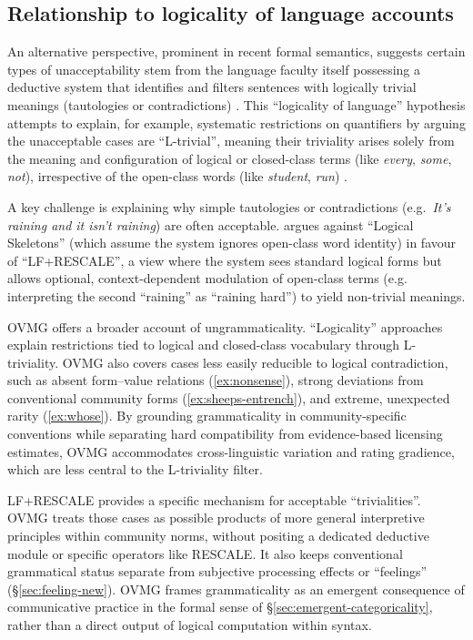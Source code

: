 \documentclass[12pt,letterpaper]{article}
\newcommand{\mention}[1]{\textit{#1}}
\begin{document}
\subsection{Relationship to logicality of language accounts}

An alternative perspective, prominent in recent formal semantics, suggests certain types of unacceptability stem from the language faculty itself possessing a deductive system that identifies and filters sentences with logically trivial meanings (tautologies or contradictions) \autocite[cf.][]{del_pinal_logicality_2019, chierchia_logic_2013, fox_economy_2000}. This \enquote{logicality of language} hypothesis attempts to explain, for example, systematic restrictions on quantifiers by arguing the unacceptable cases are \enquote{L-trivial}, meaning their triviality arises solely from the meaning and configuration of logical or closed-class terms (like \mention{every}, \mention{some}, \mention{not}), irrespective of the open-class words (like \mention{student}, \mention{run}) \autocite{gajewski_l-triviality_2009}.

A key challenge is explaining why simple tautologies or contradictions (e.g.\, \mention{It's raining and it isn't raining}) are often acceptable. \textcite{del_pinal_logicality_2019} argues against \enquote{Logical Skeletons} (which assume the system ignores open-class word identity) in favour of \enquote{LF+RESCALE}, a view where the system sees standard logical forms but allows optional, context-dependent modulation of open-class terms (e.g.\, interpreting the second \enquote{raining} as \enquote{raining hard}) to yield non-trivial meanings.

OVMG offers a broader account of ungrammaticality. \enquote{Logicality}
approaches explain restrictions tied to logical and closed-class vocabulary
through L-triviality. OVMG also covers cases less easily reducible to logical
contradiction, such as absent form--value relations (\ref{ex:nonsense}), strong
deviations from conventional community forms (\ref{ex:sheeps-entrench}), and
extreme, unexpected rarity (\ref{ex:whose}). By grounding grammaticality in
community-specific conventions while separating hard compatibility from
evidence-based licensing estimates, OVMG accommodates cross-linguistic
variation and rating gradience, which are less central to the L-triviality
filter.

LF+RESCALE provides a specific mechanism for acceptable \enquote{trivialities}. OVMG treats those cases as possible products of more general interpretive principles within community norms, without positing a dedicated deductive module or specific operators like RESCALE. It also keeps conventional grammatical status separate from subjective processing effects or \enquote{feelings} (\S\ref{sec:feeling-new}). OVMG frames grammaticality as an emergent consequence of communicative practice in the formal sense of \S\ref{sec:emergent-categoricality}, rather than a direct output of logical computation within syntax.
\end{document}
